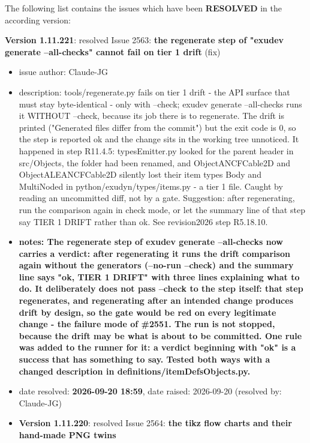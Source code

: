 \par \noindent The following list contains the issues which have been {\bf RESOLVED} in the according version:
\bi \setlength\itemsep{-4pt} \scriptsize 
  \item[] {\bf Version 1.11.221}:  resolved Issue 2563: {\bf the regenerate step of "exudev generate --all-checks" cannot fail on tier 1 drift}
(fix)
\vspace{-6pt}   \begin{itemize} \setlength\itemsep{-1pt}
    \item issue author: Claude-JG
    \item {description: tools/regenerate.py fails on tier 1 drift - the API surface that must stay byte-identical - only with --check; exudev generate --all-checks runs it WITHOUT --check, because its job there is to regenerate. The drift is printed ("Generated files differ from the commit") but the exit code is 0, so the step is reported ok and the change sits in the working tree unnoticed. It happened in step R11.4.5: typesEmitter.py looked for the parent header in src/Objects, the folder had been renamed, and ObjectANCFCable2D and ObjectALEANCFCable2D silently lost their item types Body and MultiNoded in python/exudyn/types/items.py - a tier 1 file. Caught by reading an uncommitted diff, not by a gate. Suggestion: after regenerating, run the comparison again in check mode, or let the summary line of that step say TIER 1 DRIFT rather than ok. See revision2026 step R5.18.10.}
    \item {\bf notes: The regenerate step of exudev generate --all-checks now carries a verdict: after regenerating it runs the drift comparison again without the generators (--no-run --check) and the summary line says "ok, TIER 1 DRIFT" with three lines explaining what to do. It deliberately does not pass --check to the step itself: that step regenerates, and regenerating after an intended change produces drift by design, so the gate would be red on every legitimate change - the failure mode of \#2551. The run is not stopped, because the drift may be what is about to be committed. One rule was added to the runner for it: a verdict beginning with "ok" is a success that has something to say. Tested both ways with a changed description in definitions/itemDefsObjects.py.}
    \item   date resolved: {\bf 2026-09-20 18:59},
date raised: 2026-09-20 (resolved by: Claude-JG)
  \ei
  \item[] {\bf Version 1.11.220}:  resolved Issue 2564: {\bf the tikz flow charts and their hand-made PNG twins}

\end{itemize}
